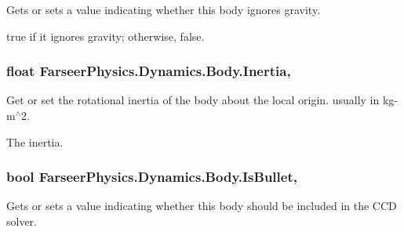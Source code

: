 Gets or sets a value indicating whether this body ignores gravity. 

{\ttfamily true} if it ignores gravity; otherwise, {\ttfamily false}.\hypertarget{class_farseer_physics_1_1_dynamics_1_1_body_ae3d5f6e2aadcce6f3ee52f46e7a36a87}{
\subsubsection[{Inertia}]{\setlength{\rightskip}{0pt plus 5cm}float Farseer\+Physics.\+Dynamics.\+Body.\+Inertia\hspace{0.3cm}{\ttfamily [get]}, {\ttfamily [set]}}}\label{class_farseer_physics_1_1_dynamics_1_1_body_ae3d5f6e2aadcce6f3ee52f46e7a36a87}


Get or set the rotational inertia of the body about the local origin. usually in kg-\/m$^\wedge$2. 

The inertia.\hypertarget{class_farseer_physics_1_1_dynamics_1_1_body_a53ec3ed5fe9217ed48db503176d56bba}{
\subsubsection[{Is\+Bullet}]{\setlength{\rightskip}{0pt plus 5cm}bool Farseer\+Physics.\+Dynamics.\+Body.\+Is\+Bullet\hspace{0.3cm}{\ttfamily [get]}, {\ttfamily [set]}}}\label{class_farseer_physics_1_1_dynamics_1_1_body_a53ec3ed5fe9217ed48db503176d56bba}


Gets or sets a value indicating whether this body should be included in the C\+C\+D solver. 


